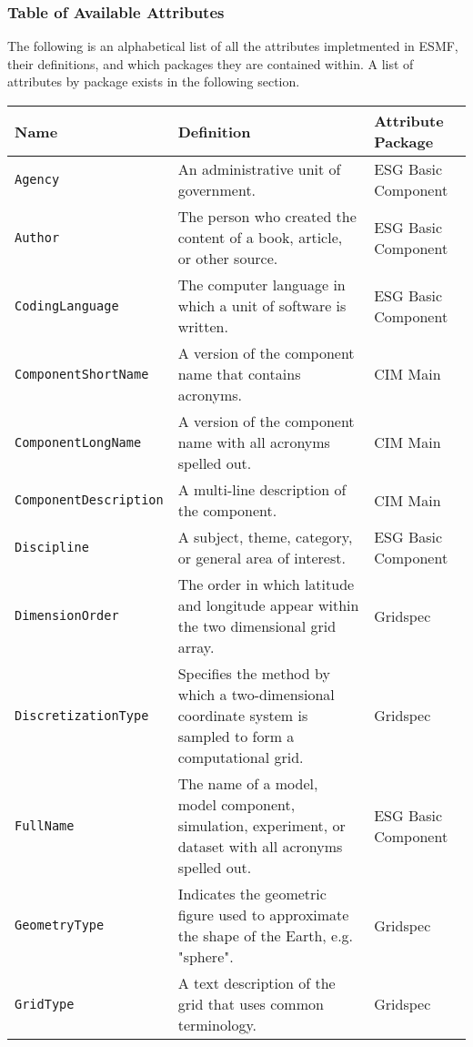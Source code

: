 \vspace{.20in}
\subsubsection{Table of Available Attributes}

The following is an alphabetical list of all the attributes impletmented in ESMF, their definitions, and which packages they are contained within. A list of attributes by package exists in the following section. 


\begin{tabular}{|p{8cm}|p{20cm}|p{10cm}}
     \hline\hline
     {\bf Name} & {\bf Definition} & {\bf Attribute Package}\\
     \hline\hline
     {\tt Agency} & An administrative unit of government.& ESG Basic Component\\
     {\tt Author} & The person who created the content of a book, article, or other source. & ESG Basic Component\\
     {\tt CodingLanguage} & The computer language in which a unit of software is written. & ESG Basic Component\\
     {\tt ComponentShortName} & A version of the component name that contains acronyms. & CIM Main\\
     {\tt ComponentLongName} & A version of the component name with all acronyms spelled out. & CIM Main\\
     {\tt ComponentDescription} & A multi-line description of the component. & CIM Main \\
     {\tt Discipline} & A subject, theme, category, or general area of interest.& ESG Basic Component \\
     {\tt DimensionOrder} & The order in which latitude and longitude appear within the two dimensional grid array. & Gridspec\\ 
     {\tt DiscretizationType} & Specifies the method by which a two-dimensional coordinate system is sampled to form a computational grid.& Gridspec \\
     {\tt FullName} & The name of a model, model component, simulation, experiment, or dataset with all acronyms spelled out.& ESG Basic Component\\
     {\tt GeometryType} & Indicates the geometric figure used to approximate the shape of the Earth, e.g. "sphere". & Gridspec \\
     {\tt GridType} & A text description of the grid that uses common terminology. & Gridspec \\

\end{tabular}
